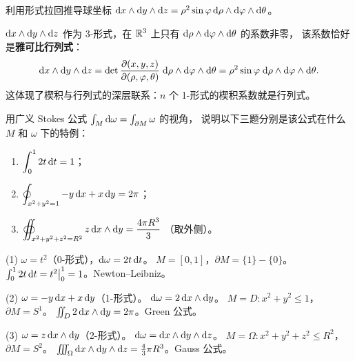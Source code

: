 \documentclass{article}
\begin{document}
\begin{exercise}[拉回——球坐标的雅可比]
  利用形式拉回推导球坐标 $\mathrm{d} x\wedge\mathrm{d} y\wedge\mathrm{d} z =
  \rho^2\sin\varphi\,\mathrm{d}\rho\wedge\mathrm{d}\varphi\wedge\mathrm{d}\theta$。
\end{exercise}

\begin{solution}
  $\mathrm{d} x\wedge\mathrm{d} y\wedge\mathrm{d} z$ 作为 3-形式，在 $\mathbb{R}^3$ 上只有
  $\mathrm{d}\rho\wedge\mathrm{d}\varphi\wedge\mathrm{d}\theta$ 的系数非零，
  该系数恰好是\textbf{雅可比行列式}：
  \[
    \mathrm{d} x\wedge\mathrm{d} y\wedge\mathrm{d} z
    =
    \det\frac{\partial(x,y,z)}{\partial(\rho,\varphi,\theta)}\;\mathrm{d}\rho\wedge\mathrm{d}\varphi\wedge\mathrm{d}\theta
    = \rho^2\sin\varphi\;\mathrm{d}\rho\wedge\mathrm{d}\varphi\wedge\mathrm{d}\theta.
  \]
  这体现了楔积与行列式的深层联系：$n$ 个 1-形式的楔积系数就是行列式。
\end{solution}

\begin{exercise}
  用广义 Stokes 公式 $\int_M\mathrm{d}\omega = \int_{\partial M}\omega$ 的视角，
  说明以下三题分别是该公式在什么 $M$ 和 $\omega$ 下的特例：
  \begin{enumerate}
    \item $\displaystyle\int_0^1 2t\,\mathrm{d} t = 1$；
    \item $\displaystyle\oint_{x^2+y^2=1} -y\,\mathrm{d} x + x\,\mathrm{d} y = 2\pi$；
    \item $\displaystyle\oiint_{x^2+y^2+z^2=R^2} z\,\mathrm{d} x\wedge\mathrm{d}
      y = \frac{4\pi R^3}{3}$
      （取外侧）。
  \end{enumerate}
\end{exercise}

\begin{solution}
  (1) $\omega = t^2$（0-形式），$\mathrm{d}\omega = 2t\,\mathrm{d} t$。
  $M = [0,1]$，$\partial M = \{1\} - \{0\}$。
  $\int_0^1 2t\,\mathrm{d} t = t^2\big|_0^1 = 1$。Newton--Leibniz。

  (2) $\omega = -y\,\mathrm{d} x + x\,\mathrm{d} y$（1-形式）。
  $\mathrm{d}\omega = 2\,\mathrm{d} x\wedge\mathrm{d} y$。
  $M = D: x^2+y^2\le 1$，$\partial M = S^1$。
  $\iint_D 2\,\mathrm{d} x\wedge\mathrm{d} y = 2\pi$。Green 公式。

  (3) $\omega = z\,\mathrm{d} x\wedge\mathrm{d} y$（2-形式）。
  $\mathrm{d}\omega = \mathrm{d} x\wedge\mathrm{d} y\wedge\mathrm{d} z$。
  $M = \Omega: x^2+y^2+z^2\le R^2$，$\partial M = S^2$。
  $\iiint_\Omega \mathrm{d} x\wedge\mathrm{d} y\wedge\mathrm{d} z = \frac{4}{3}\pi R^3$。Gauss 公式。
\end{solution}
\end{document}
